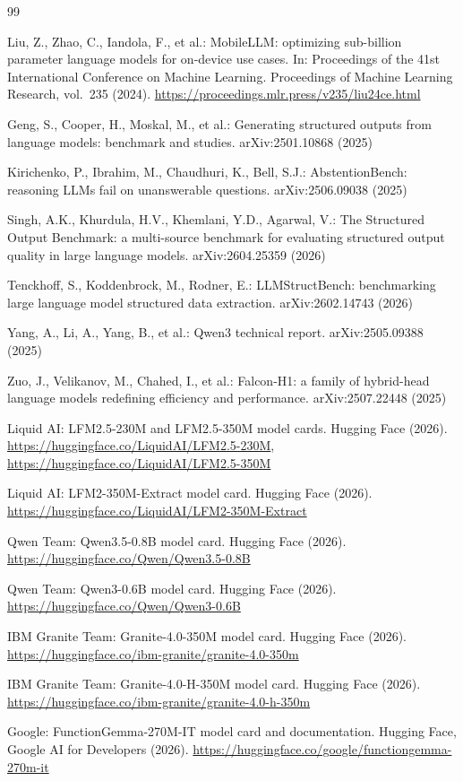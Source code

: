 \documentclass{svproc}
\begin{document}
\begin{thebibliography}{99}
\setlength{\itemsep}{0pt plus 0.3pt}
\setlength{\parsep}{0pt}

Liu, Z., Zhao, C., Iandola, F., et al.: MobileLLM: optimizing sub-billion parameter language models for on-device use cases. In: Proceedings of the 41st International Conference on Machine Learning. Proceedings of Machine Learning Research, vol.~235 (2024). \url{https://proceedings.mlr.press/v235/liu24ce.html}

Geng, S., Cooper, H., Moskal, M., et al.: Generating structured outputs from language models: benchmark and studies. arXiv:2501.10868 (2025)

Kirichenko, P., Ibrahim, M., Chaudhuri, K., Bell, S.J.: AbstentionBench: reasoning LLMs fail on unanswerable questions. arXiv:2506.09038 (2025)

Singh, A.K., Khurdula, H.V., Khemlani, Y.D., Agarwal, V.: The Structured Output Benchmark: a multi-source benchmark for evaluating structured output quality in large language models. arXiv:2604.25359 (2026)

Tenckhoff, S., Koddenbrock, M., Rodner, E.: LLMStructBench: benchmarking large language model structured data extraction. arXiv:2602.14743 (2026)

Yang, A., Li, A., Yang, B., et al.: Qwen3 technical report. arXiv:2505.09388 (2025)

Zuo, J., Velikanov, M., Chahed, I., et al.: Falcon-H1: a family of hybrid-head language models redefining efficiency and performance. arXiv:2507.22448 (2025)

Liquid AI: LFM2.5-230M and LFM2.5-350M model cards. Hugging Face (2026). \url{https://huggingface.co/LiquidAI/LFM2.5-230M}, \url{https://huggingface.co/LiquidAI/LFM2.5-350M}

Liquid AI: LFM2-350M-Extract model card. Hugging Face (2026). \url{https://huggingface.co/LiquidAI/LFM2-350M-Extract}

Qwen Team: Qwen3.5-0.8B model card. Hugging Face (2026). \url{https://huggingface.co/Qwen/Qwen3.5-0.8B}

Qwen Team: Qwen3-0.6B model card. Hugging Face (2026). \url{https://huggingface.co/Qwen/Qwen3-0.6B}

IBM Granite Team: Granite-4.0-350M model card. Hugging Face (2026). \url{https://huggingface.co/ibm-granite/granite-4.0-350m}

IBM Granite Team: Granite-4.0-H-350M model card. Hugging Face (2026). \url{https://huggingface.co/ibm-granite/granite-4.0-h-350m}

Google: FunctionGemma-270M-IT model card and documentation. Hugging Face, Google AI for Developers (2026). \url{https://huggingface.co/google/functiongemma-270m-it}

\end{thebibliography}
\end{document}

